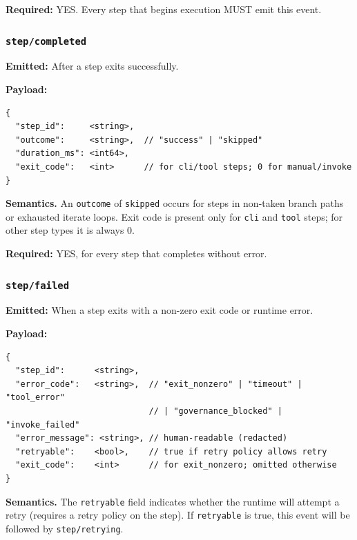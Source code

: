 \textbf{Required:} YES. Every step that begins execution MUST emit this event.


\subsubsection{\texttt{step/completed}}

\textbf{Emitted:} After a step exits successfully.

\textbf{Payload:}
\begin{verbatim}
{
  "step_id":     <string>,
  "outcome":     <string>,  // "success" | "skipped"
  "duration_ms": <int64>,
  "exit_code":   <int>      // for cli/tool steps; 0 for manual/invoke
}
\end{verbatim}

\textbf{Semantics.} An \texttt{outcome} of \texttt{skipped} occurs for steps in non-taken branch paths or exhausted iterate loops. Exit code is present only for \texttt{cli} and \texttt{tool} steps; for other step types it is always 0.

\textbf{Required:} YES, for every step that completes without error.


\subsubsection{\texttt{step/failed}}

\textbf{Emitted:} When a step exits with a non-zero exit code or runtime error.

\textbf{Payload:}
\begin{verbatim}
{
  "step_id":      <string>,
  "error_code":   <string>,  // "exit_nonzero" | "timeout" | "tool_error"
                             // | "governance_blocked" | "invoke_failed"
  "error_message": <string>, // human-readable (redacted)
  "retryable":    <bool>,    // true if retry policy allows retry
  "exit_code":    <int>      // for exit_nonzero; omitted otherwise
}
\end{verbatim}

\textbf{Semantics.} The \texttt{retryable} field indicates whether the runtime will attempt a retry (requires a retry policy on the step). If \texttt{retryable} is true, this event will be followed by \texttt{step/retrying}.

